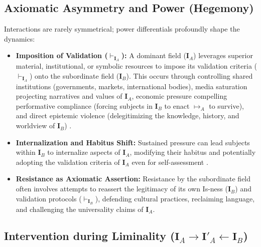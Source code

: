 \documentclass{article}
\newcommand{\Isness}{\mathbf{I}}            %
\newcommand{\enactment}{\ensuremath{\mapsto}} %
\newcommand{\validates}[1]{\ensuremath{\vdash_{#1}}} %
\begin{document}
\subsection{Axiomatic Asymmetry and Power (Hegemony)}

Interactions are rarely symmetrical; power differentials profoundly shape the dynamics:
\begin{itemize}
    \item \textbf{Imposition of Validation ($\validates{\Isness_A}$):} A dominant field ($\Isness_A$) leverages superior material, institutional, or symbolic resources to impose its validation criteria ($\validates{\Isness_A}$) onto the subordinate field ($\Isness_B$). This occurs through controlling shared institutions (governments, markets, international bodies), media saturation projecting narratives and values of $\Isness_A$, economic pressure compelling performative compliance (forcing subjects in $\Isness_B$ to enact $\enactment_A$ to survive), and direct epistemic violence (delegitimizing the knowledge, history, and worldview of $\Isness_B$) \citep{Foucault1970}.
    \item \textbf{Internalization and Habitus Shift:} Sustained pressure can lead subjects within $\Isness_B$ to internalize aspects of $\Isness_A$, modifying their habitus and potentially adopting the validation criteria of $\Isness_A$ even for self-assessment \citep{Bourdieu1977}.
    \item \textbf{Resistance as Axiomatic Assertion:} Resistance by the subordinate field often involves attempts to reassert the legitimacy of its own Is-ness ($\Isness_B$) and validation protocols ($\validates{\Isness_B}$), defending cultural practices, reclaiming language, and challenging the universality claims of $\Isness_A$.
\end{itemize}

\subsection{Intervention during Liminality ($\Isness_A \rightarrow \Isness'_A \leftarrow \Isness_B$)}
\end{document}
